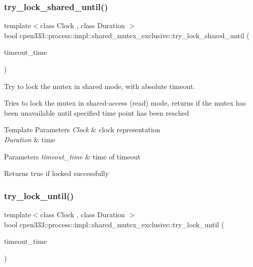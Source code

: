 \subsubsection{\texorpdfstring{try\+\_\+lock\+\_\+shared\+\_\+until()}{try\_lock\_shared\_until()}}
{\footnotesize\ttfamily template$<$class Clock , class Duration $>$ \\
bool cpen333\+::process\+::impl\+::shared\+\_\+mutex\+\_\+exclusive\+::try\+\_\+lock\+\_\+shared\+\_\+until (\begin{DoxyParamCaption}\item[{const std\+::chrono\+::time\+\_\+point$<$ Clock, Duration $>$ \&}]{timeout\+\_\+time }\end{DoxyParamCaption})\hspace{0.3cm}{\ttfamily [inline]}}



Try to lock the mutex in shared mode, with absolute timeout. 

Tries to lock the mutex in shared-\/access (read) mode, returns if the mutex has been unavailable until specified time point has been reached


\begin{DoxyTemplParams}{Template Parameters}
{\em Clock} & clock representation \\
\hline
{\em Duration} & time \\
\hline
\end{DoxyTemplParams}

\begin{DoxyParams}{Parameters}
{\em timeout\+\_\+time} & time of timeout \\
\hline
\end{DoxyParams}
\begin{DoxyReturn}{Returns}
true if locked successfully 
\end{DoxyReturn}
\mbox{\label{classcpen333_1_1process_1_1impl_1_1shared__mutex__exclusive_ada5717115b6cc1794422c4ae0a691a07}} 
\subsubsection{\texorpdfstring{try\+\_\+lock\+\_\+until()}{try\_lock\_until()}}
{\footnotesize\ttfamily template$<$class Clock , class Duration $>$ \\
bool cpen333\+::process\+::impl\+::shared\+\_\+mutex\+\_\+exclusive\+::try\+\_\+lock\+\_\+until (\begin{DoxyParamCaption}\item[{const std\+::chrono\+::time\+\_\+point$<$ Clock, Duration $>$ \&}]{timeout\+\_\+time }\end{DoxyParamCaption})\hspace{0.3cm}{\ttfamily [inline]}}



